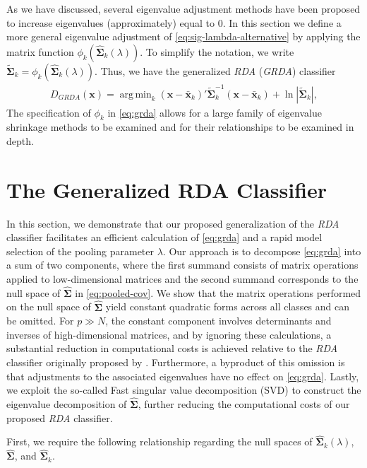 \documentclass[11pt]{article}
\newcommand{\xbar}{\bar{\bm x}}
\DeclareMathOperator*{\argmin}{arg\,min}
\begin{document}
As we have discussed, several eigenvalue adjustment methods have been proposed to increase eigenvalues (approximately) equal to 0. In this section we define a more general eigenvalue adjustment of \eqref{eq:sig-lambda-alternative} by applying the matrix function $\phi_k(\widehat{\bm \Sigma}_k(\lambda))$. To simplify the notation, we write $\tilde{\bm \Sigma}_k = \phi_k(\widehat{\bm \Sigma}_k(\lambda))$. Thus, we have the generalized \emph{RDA} (\emph{GRDA}) classifier
\begin{align}
	D_{GRDA}(\bm x) = \argmin_{k}  (\bm x - \xbar_k)'\tilde{\bm\Sigma}_k^{-1}(\bm x - \xbar_k)  + \ln |\tilde{\bm\Sigma}_k|, \label{eq:grda}
\end{align}
The specification of $\phi_k$ in \eqref{eq:grda} allows for a large family of eigenvalue shrinkage methods to be examined and for their relationships to be examined in depth.

\section{The Generalized RDA Classifier}
In this section, we demonstrate that our proposed generalization of the \emph{RDA} classifier facilitates an efficient calculation of \eqref{eq:grda} and a rapid model selection of the pooling parameter $\lambda$. Our approach is to decompose \eqref{eq:grda} into a sum of two components, where the first summand consists of matrix operations applied to low-dimensional matrices and the second summand corresponds to the null space of $\widehat{\bm \Sigma}$ in \eqref{eq:pooled-cov}. We show that the matrix operations performed on the null space of $\widehat{\bm \Sigma}$ yield constant quadratic forms across all classes and can be omitted. For $p \gg N$, the constant component involves determinants and inverses of high-dimensional matrices, and by ignoring these calculations, a substantial reduction in computational costs is achieved relative to the \emph{RDA} classifier originally proposed by \cite{Friedman:1989tm}. Furthermore, a byproduct of this omission is that adjustments to the associated eigenvalues have no effect on \eqref{eq:grda}. Lastly, we exploit the so-called Fast singular value decomposition (SVD) to construct the eigenvalue decomposition of $\widehat{\bm \Sigma}$, further reducing the computational costs of our proposed \emph{RDA} classifier.

First, we require the following relationship regarding the null spaces of $\widehat{\bm \Sigma}_k(\lambda)$, $\widehat{\bm \Sigma}$, and $\widehat{\bm \Sigma}_k$.
\end{document}
